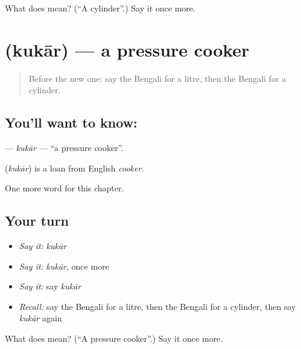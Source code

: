\begin{tcolorbox}[breakable,colback=teal!4,colframe=teal!35!black,title={Before you move on}]
What does  mean? (\textquotedblleft{}A cylinder\textquotedblright{}.) Say it once more.
\end{tcolorbox}
\section[\texorpdfstring{\bn{কুকার} (kukār)}{কুকার (kukār)}]{ (kukār) — a pressure cooker}

\label{lesson:BN-C206-kukar}



\begin{quote}
Before the new one: say the Bengali for a litre, then the Bengali for a cylinder.
\end{quote}

\subsection*{You'll want to know: }
\textbf{} — \emph{kukār} — \textquotedblleft{}a pressure cooker\textquotedblright{}.

\begin{cousinweb}
\textbf{} (\emph{kukār}) is a loan from English \emph{cooker}.
\end{cousinweb}

\begin{grammarlens}[title={What you've built}]
One more word for this chapter.
\end{grammarlens}

\subsection*{Your turn}
\begin{itemize}
\raggedright
  \item \emph{Say it:} \emph{kukār}
  \item \emph{Say it:} \emph{kukār}, once more
  \item \emph{Say it:} say \emph{kukār}
  \item \emph{Recall:} say the Bengali for a litre, then the Bengali for a cylinder, then say \emph{kukār} again
\end{itemize}

\begin{tcolorbox}[breakable,colback=teal!4,colframe=teal!35!black,title={Before you move on}]
What does  mean? (\textquotedblleft{}A pressure cooker\textquotedblright{}.) Say it once more.
\end{tcolorbox}
